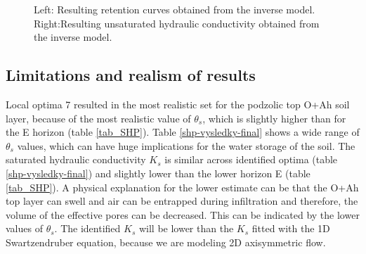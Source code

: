 \documentclass[review,times,3p,10pt]{elsarticle}
\begin{document}
\begin{figure}
\centering
{}
\caption{Left: Resulting retention curves obtained from the inverse model. Right:Resulting unsaturated hydraulic conductivity obtained from the inverse model. }
\label{retc-final}
\end{figure}


\subsection{Limitations and realism of results}


Local optima 7 resulted in the most realistic set for the podzolic top O+Ah soil layer, because of the most realistic value of $\theta_s$, which is slightly higher than for the E horizon (table \ref{tab_SHP}). Table \ref{shp-vysledky-final} shows a wide range of $\theta_s$ values, which can have huge implications for the water storage of the soil. The saturated hydraulic conductivity $K_s$ is similar across identified optima (table \ref{shp-vysledky-final}) and slightly lower than the lower horizon E (table \ref{tab_SHP}). A physical explanation for the lower estimate can be that the O+Ah top layer can swell and air can be entrapped during infiltration and therefore, the volume of the effective pores can be decreased. This can be indicated by the lower values of $\theta_s$. The identified $K_s$ will be lower than the $K_s$ fitted with the 1D Swartzendruber equation, because we are modeling 2D axisymmetric flow. 
\end{document}
